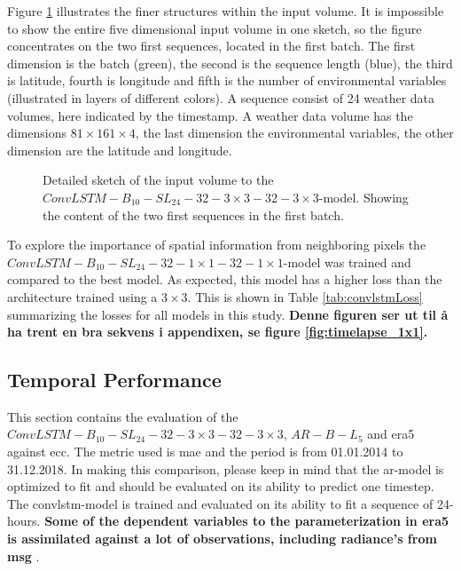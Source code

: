 Figure \ref{fig:input_volume_conv_lstm} illustrates the finer structures within the input volume. It is impossible to show the entire five dimensional input volume in one sketch, so the figure concentrates on the two first sequences, located in the first batch. The first dimension is the batch (green), the second is the sequence length (blue), the third is latitude, fourth is longitude and fifth is the number of environmental variables (illustrated in layers of different colors). A sequence consist of 24 weather data volumes, here indicated by the timestamp. A weather data volume has the dimensions $81\times161\times4$, the last dimension the environmental variables, the other dimension are the latitude and longitude. 
\begin{figure}
    \centering
    
    \caption{Detailed sketch of the input volume to the $ConvLSTM-B_{10}-SL_{24}-32-3\times3-32-3 \times3$-model. Showing the content of the two first sequences in the first batch.}
    \label{fig:input_volume_conv_lstm}
\end{figure}

To explore the importance of spatial information from neighboring pixels the $ConvLSTM-B_{10}-SL_{24}-32-1\times1-32-1 \times1$-model was trained and compared to the best model. As expected, this model has a higher loss than the architecture trained using a $3\times 3$. This is shown in Table \ref{tab:convlstmLoss} summarizing the losses for all models in this study. \textbf{Denne figuren ser ut til å ha trent en bra sekvens i appendixen, se figure \ref{fig:timelapse_1x1}.}

\subsection{Temporal Performance}
This section contains the evaluation of the $ConvLSTM-B_{10}-SL_{24}-32-3\times3-32-3 \times3$, $AR-B-L_5$ and \acrshort{era5} against \acrshort{ecc}. The metric used is \acrshort{mae} and the period is from 01.01.2014 to 31.12.2018. In making this comparison, please keep in mind that the \acrshort{ar}-model is optimized to fit and should be evaluated on its ability to predict one timestep. The \acrshort{convlstm}-model is trained and evaluated on its ability to fit a sequence of 24-hours.\textbf{ Some of the dependent variables to the parameterization in \acrshort{era5} is assimilated against a lot of observations, including radiance's from \acrlong{msg}} \cite{ERA52020}.

